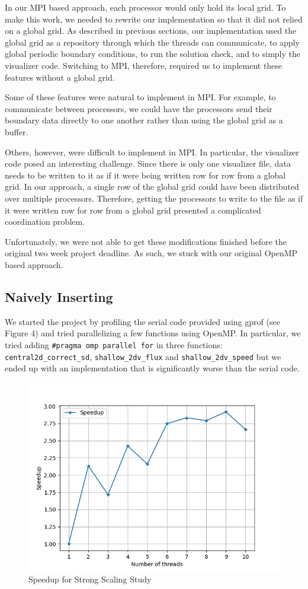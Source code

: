 \documentclass{article}
\begin{document}
In our MPI based approach, each processor would only hold its local grid.
To make this work, we needed to rewrite our implementation so that it did not relied on a global grid.
As described in previous sections, our implementation used the global grid as a repository through which the threads can communicate, to apply global periodic boundary conditions, to run the solution check, and to simply the visualizer code.
Switching to MPI, therefore, required us to implement these features without a global grid.

Some of these features were natural to implement in MPI.
For example, to communicate between processors, we could have the processors send their boundary data directly to one another rather than using the global grid as a buffer.

Others, however, were difficult to implement in MPI.
In particular, the visualizer code posed an interesting challenge.
Since there is only one visualizer file, data needs to be written to it as if it were being written row for row from a global grid.
In our approach, a single row of the global grid could have been distributed over multiple processors.
Therefore, getting the processors to write to the file as if it were written row for row from a global grid presented a complicated coordination problem.

Unfortunately, we were not able to get these modifications finished before the original two week project deadline.
As such, we stuck with our original OpenMP based approach.

\subsection{Naively Inserting }

We started the project by profiling the serial code provided using gprof (see Figure 4) and tried parallelizing a few functions using OpenMP. In particular, we tried adding \texttt{\#pragma omp parallel for} in three functions: \texttt{central2d\_correct\_sd}, \texttt{shallow\_2dv\_flux} and \texttt{shallow\_2dv\_speed} but we ended up with an implementation that is significantly worse than the serial code.

\begin{figure}[h!]
	\centering
	\includegraphics[width=0.8\columnwidth]{../strong_scaling.jpg}
	\caption{Speedup for Strong Scaling Study}
	\label{fig:strong_scaling}
\end{figure}
\end{document}
